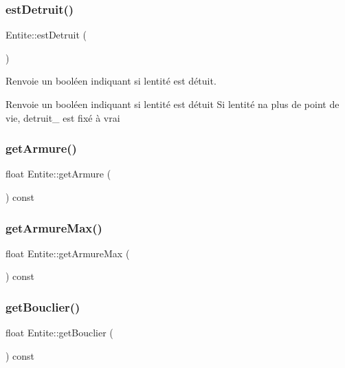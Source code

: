 \subsubsection{\texorpdfstring{est\+Detruit()}{estDetruit()}}
{\footnotesize\ttfamily Entite\+::est\+Detruit (\begin{DoxyParamCaption}{ }\end{DoxyParamCaption})}



Renvoie un booléen indiquant si l\textquotesingle{}entité est détuit. 

Renvoie un booléen indiquant si l\textquotesingle{}entité est détuit Si l\textquotesingle{}entité n\textquotesingle{}a plus de point de vie, detruit\+\_\+ est fixé à vrai \mbox{\label{class_entite_a06ac37b64ff428cd03ba0c935c101227}} 
\subsubsection{\texorpdfstring{get\+Armure()}{getArmure()}}
{\footnotesize\ttfamily float Entite\+::get\+Armure (\begin{DoxyParamCaption}{ }\end{DoxyParamCaption}) const\hspace{0.3cm}{\ttfamily [inline]}}

\mbox{\label{class_entite_aa7c171ab62d923d8b6f2912851ac7b1d}} 
\subsubsection{\texorpdfstring{get\+Armure\+Max()}{getArmureMax()}}
{\footnotesize\ttfamily float Entite\+::get\+Armure\+Max (\begin{DoxyParamCaption}{ }\end{DoxyParamCaption}) const\hspace{0.3cm}{\ttfamily [inline]}}

\mbox{\label{class_entite_ae680682baaeab669956e9060fca74923}} 
\subsubsection{\texorpdfstring{get\+Bouclier()}{getBouclier()}}
{\footnotesize\ttfamily float Entite\+::get\+Bouclier (\begin{DoxyParamCaption}{ }\end{DoxyParamCaption}) const\hspace{0.3cm}{\ttfamily [inline]}}

